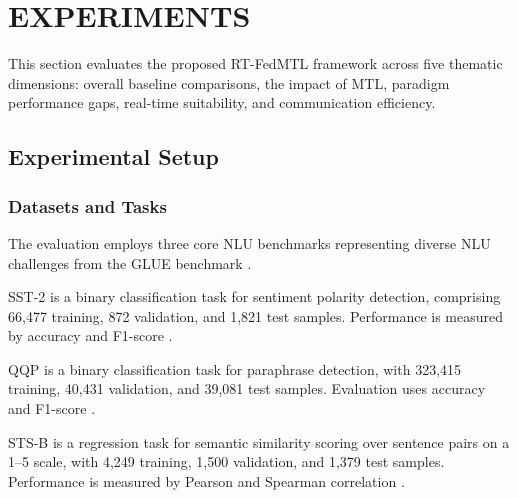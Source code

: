 \section{EXPERIMENTS}
\label{sec:experiments}

This section evaluates the proposed RT-FedMTL framework across five thematic dimensions: overall baseline comparisons, the impact of MTL, paradigm performance gaps, real-time suitability, and communication efficiency.
\subsection{Experimental Setup}



\subsubsection{Datasets and Tasks}

The evaluation employs three core NLU benchmarks representing diverse NLU challenges from the GLUE benchmark \cite{wang2018glue}.

SST-2 \cite{socher2013sst} is a binary classification task for sentiment polarity detection, comprising 66,477 training, 872 validation, and 1,821 test samples. Performance is measured by accuracy and F1-score \cite{vanrijsbergen1979}.

QQP \cite{sharma2019qqp} is a binary classification task for paraphrase detection, with 323,415 training, 40,431 validation, and 39,081 test samples. Evaluation uses accuracy and F1-score \cite{vanrijsbergen1979}.

STS-B \cite{cer2017stsb} is a regression task for semantic similarity scoring over sentence pairs on a 1–5 scale, with 4,249 training, 1,500 validation, and 1,379 test samples. Performance is measured by Pearson \cite{pearson1895} and Spearman correlation \cite{spearman1904}.




